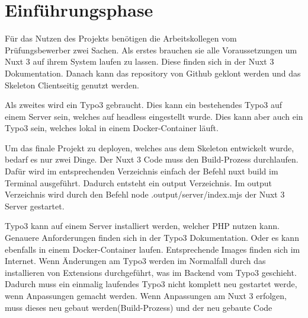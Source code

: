 \section{Einführungsphase}
\label{sec:Einfuehrungsphase}

Für das Nutzen des Projekts benötigen die Arbeitskollegen vom Prüfungsbewerber zwei Sachen. Als erstes brauchen sie alle Voraussetzungen um Nuxt 3 auf ihrem System laufen zu lassen. Diese finden sich in der Nuxt 3 Dokumentation. Danach kann das repository von Github geklont werden und das Skeleton Clientseitig genutzt werden.

Als zweites wird ein Typo3 gebraucht. Dies kann ein bestehendes Typo3 auf einem Server sein, welches auf headless eingestellt wurde. Dies kann aber auch ein Typo3 sein, welches lokal in einem Docker-Container läuft.

Um das finale Projekt zu deployen, welches aus dem Skeleton entwickelt wurde, bedarf es nur zwei Dinge. Der Nuxt 3 Code muss den Build-Prozess durchlaufen. Dafür wird im entsprechenden Verzeichnis einfach der Befehl nuxt build im Terminal ausgeführt. Dadurch entsteht ein output Verzeichnis. Im output Verzeichnis wird durch den Befehl node .output/server/index.mjs der Nuxt 3 Server gestartet. 

Typo3 kann auf einem Server installiert werden, welcher PHP nutzen kann. Genauere Anforderungen finden sich in der Typo3 Dokumentation. Oder es kann ebenfalls in einem Docker-Container laufen. Entsprechende Images finden sich im Internet. Wenn Änderungen am Typo3 werden im Normalfall durch das installieren von Extensions durchgeführt, was im Backend vom Typo3 geschieht. Dadurch muss ein einmalig laufendes Typo3 nicht komplett neu gestartet werde, wenn Anpassungen gemacht werden. Wenn Anpassungen am Nuxt 3 erfolgen, muss dieses neu gebaut werden(Build-Prozess) und der neu gebaute Code